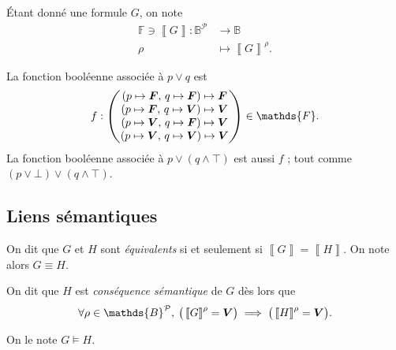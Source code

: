 \begin{defn}
	Étant donné une formule $G$, on note
	\begin{align*}
		\mathds{F} \ni \left\llbracket G \right\rrbracket : \mathds{B}^{\mathcal{P}} &\longrightarrow \mathds{B}  \\
		\rho &\longmapsto \left\llbracket G \right\rrbracket^{\rho}.
	\end{align*}
\end{defn}

\begin{exm}
	La fonction booléenne associée à $p \lor q$\/ est \[
		f : \begin{pmatrix}
			(p\mapsto {\bfm F},\,q \mapsto {\bfm F}\/)\mapsto {\bfm F}\/\\
			(p\mapsto {\bfm F},\,q \mapsto {\bfm V}\/)\mapsto {\bfm V}\/\\
			(p\mapsto {\bfm V},\,q \mapsto {\bfm F}\/)\mapsto {\bfm V}\/\\
			(p\mapsto {\bfm V},\,q \mapsto {\bfm V}\/)\mapsto {\bfm V}\/\\
		\end{pmatrix} \in \mathds{F}.
	\]
	La fonction booléenne associée à $p \lor (q \land \top)$\/ est aussi $f$ ; tout comme $(p \lor \bot) \lor (q \land \top)$.
\end{exm}

\subsection{Liens sémantiques}

\begin{defn}
	On dit que $G$\/ et $H$\/ sont {\it équivalents}\/ si et seulement si $\left\llbracket G \right\rrbracket = \left\llbracket H \right\rrbracket$.
	On note alors $G \equiv H$.
\end{defn}

\begin{defn}
	On dit que $H$\/ est {\it conséquence sémantique}\/ de $G$\/ dès lors que \[
		\forall \rho \in \mathds{B}^{\mathcal{P}},\:\big(\left\llbracket G \right\rrbracket^{\rho} = {\bfm V}\/ \big) \implies \big(\left\llbracket H \right\rrbracket^\rho = {\bfm V}\/ \big)
	.\]

	On le note $G \models H$. 
\end{defn}

